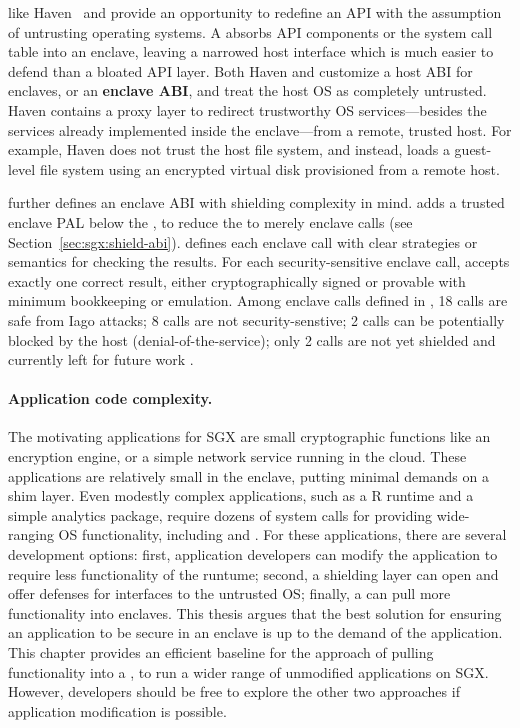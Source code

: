 \Liboses{} like Haven~\cite{baumann14haven} and \graphenesgx{} provide an opportunity to redefine an API
with the assumption of untrusting operating systems.
A \libos{} absorbs API components or the system call table into an enclave,
leaving a narrowed host interface
which is much easier to defend than a bloated API layer.
Both Haven and \graphenesgx{} customize
a host ABI for enclaves, or an {\bf enclave ABI}, and treat the host OS as completely untrusted.
Haven contains a proxy layer to redirect trustworthy OS services---besides the services already implemented inside the enclave---from a remote, trusted host.
For example, Haven does not trust the host file system,
and instead, loads a guest-level file system
using an encrypted virtual disk provisioned from a remote host.


\graphenesgx{} further defines an enclave ABI with shielding complexity in mind.
\graphenesgx{} adds a trusted enclave PAL below
the \thehostabi{}, to reduce the \palcallnum{} \hostapis{} to merely \enclavecallnum{} enclave calls (see Section~\ref{sec:sgx:shield-abi}).
\graphenesgx{} defines each enclave call with clear strategies or semantics for checking the results.
For each security-sensitive enclave call, \graphenesgx{} accepts exactly one correct result, either cryptographically signed or provable with minimum bookkeeping or emulation. 
Among \enclavecallnum{} enclave calls defined in \graphenesgx{}, 18 calls are safe from Iago attacks; 8 calls are not security-senstive; 2 calls can be potentially blocked by the host (denial-of-the-service); only 2 calls are not yet shielded and currently left for future work .







\paragraph{Application code complexity.}
The motivating applications for SGX
are small cryptographic functions like an encryption engine,
or a simple network service running in the cloud.
These applications are relatively small
in the enclave,
putting minimal demands on a shim layer. 
Even modestly complex applications, such as a R runtime and a simple analytics package, require dozens of system calls for providing wide-ranging OS functionality, 
including  and .
For these applications, there are several development options:
first, application developers can modify the application
to require less functionality of the runtume;
second, a shielding layer can open and offer defenses for 
interfaces to the untrusted OS; finally, a \libos{} can pull more functionality into enclaves.
This thesis argues that the best solution for ensuring an application to be secure in an enclave
is up to the demand of the application.
This chapter provides an efficient baseline for the approach of pulling functionality into a \libos{},
to run a wider range of unmodified applications
on SGX. However, developers should be free to explore the other two approaches if application modification is possible. 



